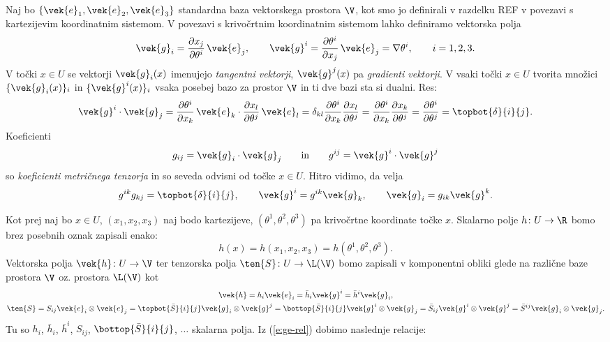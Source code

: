 Naj bo $\{\vek{e}_1,\vek{e}_2,\vek{e}_3\}$ standardna baza vektorskega prostora $\V$, kot smo jo
definirali v razdelku REF v povezavi s kartezijevim koordinatnim sistemom. V povezavi s krivočrtnim
koordinatnim sistemom lahko definiramo vektorska polja
\begin{equation} \label{e:ge-rel}
	\vek{g}_i=\frac{\partial x_j}{\partial\theta^i}\,\vek{e}_j, \qquad
	\vek{g}^i=\frac{\partial\theta^i}{\partial x_j}\,\vek{e}_j=\nabla\theta^i,
	\qquad i=1,2,3.
\end{equation}
V točki $x\in U$ se vektorji $\vek{g}_i(x)$ imenujejo \emph{tangentni vektorji},
$\vek{g}^j(x)$ pa \emph{gradienti vektorji}.
V vsaki točki $x\in U$ tvorita množici $\{\vek{g}_i(x)\}_i$ in $\{\vek{g}^i(x)\}_i$
vsaka posebej bazo za prostor $\V$ in ti dve bazi sta si dualni. Res:
\[
	\vek{g}^i\cdot\vek{g}_j=\frac{\partial\theta^i}{\partial x_k}\,\vek{e}_k\cdot
	\frac{\partial x_l}{\partial\theta^j}\,\vek{e}_l =
	\delta_{kl}\frac{\partial\theta^i}{\partial x_k}\frac{\partial x_l}{\partial\theta^j}=
	\frac{\partial\theta^i}{\partial x_k}\frac{\partial x_k}{\partial\theta^j}=
	\frac{\partial\theta^i}{\partial\theta^j}=\topbot{\delta}{i}{j}.
\]
Koeficienti
\[ g_{ij}=\vek{g}_i\cdot\vek{g}_j\qquad\textrm{in}\qquad g^{ij}=\vek{g}^i\cdot\vek{g}^j \]
so \emph{koeficienti metričnega tenzorja} in so seveda odvisni od točke $x\in U$. Hitro vidimo, da velja
\[ g^{ik}g_{kj}=\topbot{\delta}{i}{j},\qquad \vek{g}^i=g^{ik}\vek{g}_k,\qquad \vek{g}_i=g_{ik}\vek{g}^k. \]

Kot prej naj bo $x\in U$, $(x_1,x_2,x_3)$ naj bodo kartezijeve, $(\theta^1,\theta^2,\theta^3)$ pa
krivočrtne koordinate točke $x$. Skalarno polje $h\colon U\to\R$ bomo brez posebnih oznak zapisali enako:
\[ h(x)=h(x_1,x_2,x_3)=h(\theta^1,\theta^2,\theta^3). \]
Vektorska polja $\vek{h}\colon U\to\V$ ter tenzorska polja $\ten{S}\colon U\to\L(\V)$ bomo zapisali
v komponentni obliki glede na različne baze prostora $\V$ oz. prostora $\L(\V)$ kot
\begin{gather*}
	\vek{h}=h_i\vek{e}_i=\bar{h}_i\vek{g}^i=\bar{h}^i\vek{g}_i,\\
	\ten{S}=S_{ij}\vek{e}_i\otimes\vek{e}_j=
	\topbot{\bar{S}}{i}{j}\vek{g}_i\otimes\vek{g}^j=\bottop{\bar{S}}{i}{j}\vek{g}^i\otimes\vek{g}_j=
	\bar{S}_{ij}\vek{g}^i\otimes\vek{g}^j=\bar{S}^{ij}\vek{g}_i\otimes\vek{g}_j.
\end{gather*}
Tu so $h_i$, $\bar{h}_i$, $\bar{h}^i$, $S_{ij}$, $\bottop{\bar{S}}{i}{j}$, $\dots$ skalarna polja.
Iz (\ref{e:ge-rel}) dobimo naslednje relacije:

